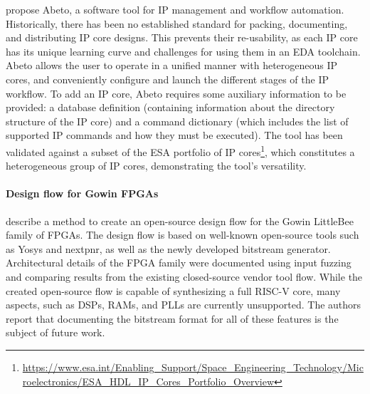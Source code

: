 \citet{Sanchez2022AbetoManagement} propose Abeto, a software tool for IP management and workflow automation. Historically, there has been no established standard for packing, documenting, and distributing IP core designs.  This prevents their re-usability, as each IP core has its unique learning curve and challenges for using them in an EDA toolchain. Abeto allows the user to operate in a unified manner with heterogeneous IP cores, and conveniently configure and launch the different stages of the IP workflow. To add an IP core, Abeto requires some auxiliary information to be provided: a database definition (containing information about the directory structure of the IP core) and a command dictionary (which includes the list of supported IP commands and how they must be executed). The tool has been validated against a subset of the ESA portfolio of IP cores\footnote{\url{https://www.esa.int/Enabling_Support/Space_Engineering_Technology/Microelectronics/ESA_HDL_IP_Cores_Portfolio_Overview}}, which constitutes a heterogeneous group of IP cores, demonstrating the tool's versatility.


\paragraph{%
Design flow for Gowin FPGAs}
\citet{vos2020gowin} describe a method %
to create an open-source design flow for the Gowin LittleBee family of FPGAs.
The design flow is based on well-known open-source tools such as Yosys and nextpnr, as well as the newly developed bitstream generator.
Architectural details of the FPGA family were documented using input fuzzing and comparing results from the existing closed-source vendor tool flow.
While the created open-source flow is capable of synthesizing a full RISC-V core, many aspects, such as DSPs, RAMs, and PLLs are currently unsupported. The authors report that documenting the bitstream format for all of these features is %
the subject of future work.



